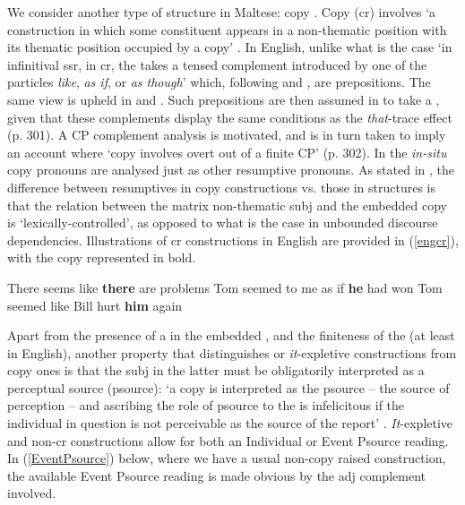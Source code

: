 \documentclass[output=paper]{LSP/langsci}
\begin{document}
We consider another type of  structure in Maltese: copy . Copy  ({\sc cr}) involves `a construction in which some constituent appears in a non-thematic position with its thematic position occupied by a  copy' \citep{PotRun}. In English, unlike what is the case `in infinitival {\sc ssr}, in {\sc cr}, the  takes a tensed  complement introduced by one of the particles \emph{like}, \emph{as if}, or \emph{as though}'  which, following  and , are prepositions. The same view is upheld in  and . Such prepositions are then assumed in  to take a , given that these complements display the same conditions as the \emph{that}-trace effect (p. 301). A CP complement analysis is motivated, and is in turn taken to imply an account where `copy  involves overt  out of a finite CP' (p. 302). In  the \emph{in-situ} copy pronouns are  analysed just as other resumptive pronouns. As stated in , the difference between resumptives in copy  constructions vs. those in  structures is that the relation between the matrix non-thematic {\sc subj} and the embedded copy  is `lexically-controlled', as opposed to what is the case in unbounded discourse dependencies. Illustrations of {\sc cr} constructions in English are provided in (\ref{engcr}), with the copy  represented in bold.

\ea \label{engcr}
\ea There seems like {\bf{there}} are problems \hfill{}%
\ex Tom seemed to me as if {\bf{he}} had won \hfill{}
\ex Tom seemed like Bill hurt {\bf{him}} again \hfill{}
\z
\z

Apart from the presence of a  in the embedded , and the finiteness of the  (at least in English), another property that distinguishes  or \emph{it}-expletive constructions from copy  ones is that the {\sc subj} in the latter must be obligatorily interpreted as a perceptual source ({\sc psource}): `a copy   is interpreted as the {\sc psource} -- the source of perception -- and ascribing the role of {\sc psource} to the  is infelicitous if the individual in question is not perceivable as the source of the report' . \emph{It}-expletive and non-{\sc cr} constructions allow for both an Individual or Event Psource reading. In (\ref{EventPsource}) below, where we have a usual non-copy raised construction, the available Event Psource reading is made obvious by the {\sc adj} complement involved. %
\end{document}
